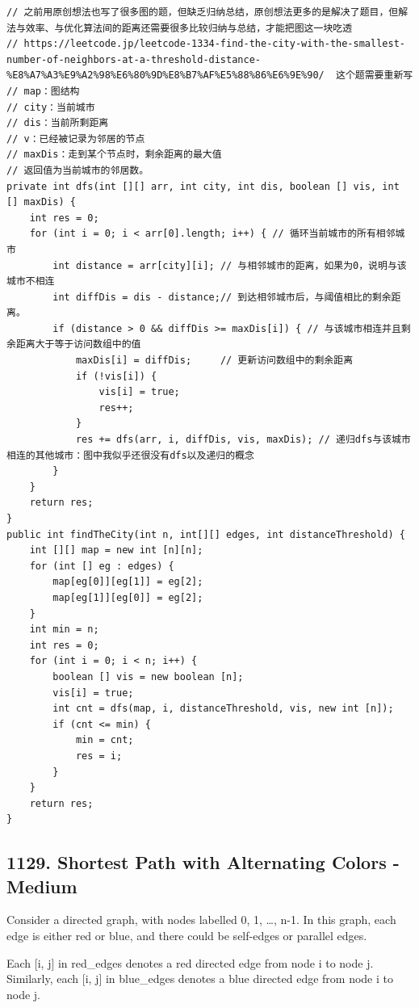 \documentclass[9pt, b5paaper]{book}
\begin{document}
\begin{verbatim}
// 之前用原创想法也写了很多图的题，但缺乏归纳总结，原创想法更多的是解决了题目，但解法与效率、与优化算法间的距离还需要很多比较归纳与总结，才能把图这一块吃透
// https://leetcode.jp/leetcode-1334-find-the-city-with-the-smallest-number-of-neighbors-at-a-threshold-distance-%E8%A7%A3%E9%A2%98%E6%80%9D%E8%B7%AF%E5%88%86%E6%9E%90/  这个题需要重新写
// map：图结构
// city：当前城市
// dis：当前所剩距离
// v：已经被记录为邻居的节点
// maxDis：走到某个节点时，剩余距离的最大值
// 返回值为当前城市的邻居数。
private int dfs(int [][] arr, int city, int dis, boolean [] vis, int [] maxDis) {
    int res = 0;
    for (int i = 0; i < arr[0].length; i++) { // 循环当前城市的所有相邻城市
        int distance = arr[city][i]; // 与相邻城市的距离，如果为0，说明与该城市不相连
        int diffDis = dis - distance;// 到达相邻城市后，与阈值相比的剩余距离。
        if (distance > 0 && diffDis >= maxDis[i]) { // 与该城市相连并且剩余距离大于等于访问数组中的值
            maxDis[i] = diffDis;     // 更新访问数组中的剩余距离   
            if (!vis[i]) {
                vis[i] = true;
                res++;
            }
            res += dfs(arr, i, diffDis, vis, maxDis); // 递归dfs与该城市相连的其他城市：图中我似乎还很没有dfs以及递归的概念
        }
    }
    return res;
}
public int findTheCity(int n, int[][] edges, int distanceThreshold) {
    int [][] map = new int [n][n];
    for (int [] eg : edges) {
        map[eg[0]][eg[1]] = eg[2];
        map[eg[1]][eg[0]] = eg[2];
    }
    int min = n;
    int res = 0;
    for (int i = 0; i < n; i++) {
        boolean [] vis = new boolean [n];
        vis[i] = true;
        int cnt = dfs(map, i, distanceThreshold, vis, new int [n]);
        if (cnt <= min) {
            min = cnt;
            res = i;
        }
    }
    return res;
}
\end{verbatim}

\subsection{1129. Shortest Path with Alternating Colors - Medium}
\label{sec-1-1-5}
Consider a directed graph, with nodes labelled 0, 1, \ldots{}, n-1.  In this graph, each edge is either red or blue, and there could be self-edges or parallel edges.

Each [i, j] in red\_edges denotes a red directed edge from node i to node j.  Similarly, each [i, j] in blue\_edges denotes a blue directed edge from node i to node j.
\end{document}
